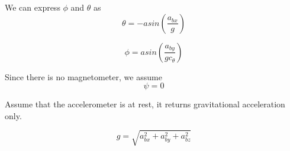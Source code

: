 \documentclass[]{article}
\begin{document}
We can express $\phi$ and $\theta$ as
\begin{equation}
\theta = -asin (\frac{a_{bx}}{g})\label{eqn:initialization:theta}
\end{equation}

\begin{equation}
\phi = asin (\frac{a_{by}}{g c_{\theta}})\label{eqn:initialization:phi}
\end{equation}

Since there is no magnetometer, we assume
\begin{equation}
\psi = 0
\end{equation}

Assume that the accelerometer is at rest, it returns gravitational acceleration only.

\begin{equation}
g = \sqrt{a_{bx}^2 + a_{by}^2 + a_{bz}^2}
\end{equation} 
\end{document}
